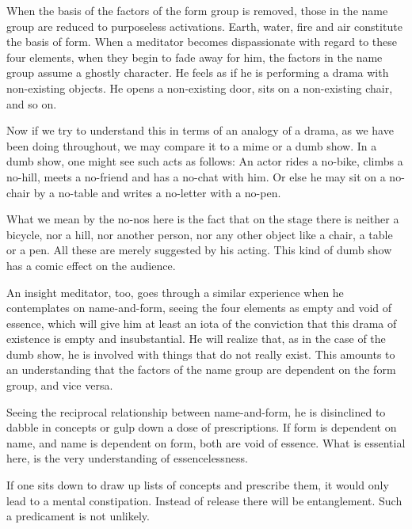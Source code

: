 When the basis of the factors of the form group is removed, those in the name group are reduced to purposeless activations. Earth, water, fire and air constitute the basis of form. When a meditator becomes dispassionate with regard to these four elements, when they begin to fade away for him, the factors in the name group assume a ghostly character. He feels as if he is performing a drama with non-existing objects. He opens a non-existing door, sits on a non-existing chair, and so on.

Now if we try to understand this in terms of an analogy of a drama, as we have been doing throughout, we may compare it to a mime or a dumb show. In a dumb show, one might see such acts as follows: An actor rides a no-bike, climbs a no-hill, meets a no-friend and has a no-chat with him. Or else he may sit on a no-chair by a no-table and writes a no-letter with a no-pen.

What we mean by the no-nos here is the fact that on the stage there is neither a bicycle, nor a hill, nor another person, nor any other object like a chair, a table or a pen. All these are merely suggested by his acting. This kind of dumb show has a comic effect on the audience.

An insight meditator, too, goes through a similar experience when he contemplates on name-and-form, seeing the four elements as empty and void of essence, which will give him at least an iota of the conviction that this drama of existence is empty and insubstantial. He will realize that, as in the case of the dumb show, he is involved with things that do not really exist. This amounts to an understanding that the factors of the name group are dependent on the form group, and vice versa.

Seeing the reciprocal relationship between name-and-form, he is disinclined to dabble in concepts or gulp down a dose of prescriptions. If form is dependent on name, and name is dependent on form, both are void of essence. What is essential here, is the very understanding of essencelessness.

If one sits down to draw up lists of concepts and prescribe them, it would only lead to a mental constipation. Instead of release there will be entanglement. Such a predicament is not unlikely.
